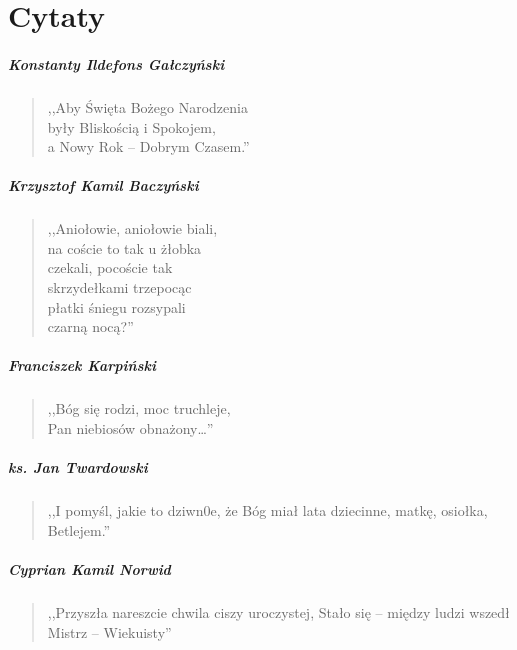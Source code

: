 \documentclass[oneside, fleqn]{book}
\begin{document}
\chapter{Cytaty}


\paragraph{Konstanty Ildefons Gałczyński}
\begin{quote}
,,Aby Święta Bożego Narodzenia \\
były Bliskością i Spokojem, \\
a Nowy Rok – Dobrym Czasem.''
\end{quote}

\paragraph{Krzysztof Kamil Baczyński}
\begin{quote}
,,Aniołowie, aniołowie biali,\\
na coście to tak u żłobka\\
czekali, pocoście tak\\
skrzydełkami trzepocąc\\
płatki śniegu rozsypali\\
czarną nocą?''\cite{angel}
\end{quote}

\paragraph{Franciszek Karpiński}
\begin{quote}
,,Bóg się rodzi, moc truchleje,\\
Pan niebiosów obnażony…''\cite{karp}
\end{quote}

\paragraph{ks. Jan Twardowski}
\begin{quote}
,,I pomyśl, jakie to dziwn0e,
że Bóg miał lata dziecinne,
matkę, osiołka, Betlejem.''
\end{quote}

\paragraph{Cyprian Kamil Norwid}
\begin{quote}
,,Przyszła nareszcie chwila ciszy uroczystej,
Stało się – między ludzi wszedł
Mistrz – Wiekuisty''
\end{quote}
\end{document}
